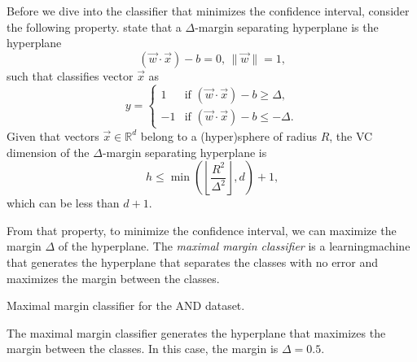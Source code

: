 Before we dive into the \gls{classifier} that minimizes the confidence interval, consider the
following property.  \textcite{Vapnik1999b} state that a
$\Delta$-margin separating hyperplane is the hyperplane
\[
  (\vec{w} \cdot \vec{x}) - b = 0\text{, } \|\vec{w}\| = 1\text{,}
\]
such that classifies vector $\vec{x}$ as
\[
  y = \begin{cases}
    1 & \text{if } (\vec{w} \cdot \vec{x}) - b \geq \Delta\text{,} \\
    -1 & \text{if } (\vec{w} \cdot \vec{x}) - b \leq -\Delta\text{.}
  \end{cases}
\]
Given that vectors $\vec{x} \in \mathbb{R}^d$ belong to a (hyper)sphere of radius $R$, the
VC dimension of the $\Delta$-margin separating hyperplane is
\[
  h \leq \min\left(\left\lfloor \frac{R^2}{\Delta^2} \right\rfloor, d\right) + 1\text{,}
\]
which can be less than $d + 1$.

From that property, to minimize the confidence interval, we can maximize the margin
$\Delta$ of the hyperplane.  The \emph{maximal margin classifier} is a \gls{learningmachine}
that generates the hyperplane that separates the classes with no error and maximizes the
margin between the classes.

\begin{figurebox}[label=fig:maximal-margin-and]{Maximal margin classifier for the AND dataset.}
  \centering
  \tcblower
  The maximal margin classifier generates the hyperplane that maximizes the margin between
  the classes.  In this case, the margin is $\Delta = 0.5$.
\end{figurebox}

